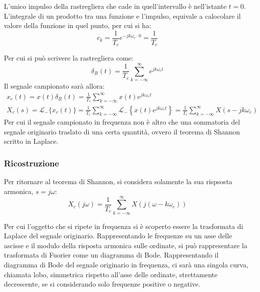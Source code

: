 \documentclass{article}
\numberwithin{equation}{subsection}
\begin{document}
L'unico impulso della rastregliera che cade in quell'intervallo è nell'istante $t=0$. L'integrale di un prodotto tra una funzione e l'impulso, equivale a calocolare il valore 
della funzione in quel punto, per cui si ha:
\begin{equation}
    c_k=\displaystyle\frac{1}{T_c}e^{-jk\omega_c \cdot0}=\frac{1}{T_c}
\end{equation}

Per cui si può scrivere la rastregliera come:
\begin{equation}
    \delta_R(t)=\displaystyle\frac{1}{T_c}\sum_{k=-\infty}^{\infty}e^{jk\omega_ct}
\end{equation}
Il segnale campionato sarà allora:
\begin{gather}
    x_c(t)=x(t)\delta_R(t)=\displaystyle\frac{1}{T_c}\sum_{k=-\infty}^{\infty}x(t)e^{jk\omega_ct}\\
    X_c(s)=\mathscr{L}_-\{x_c(t)\}=\displaystyle\frac{1}{T_c}\sum_{k=-\infty}^{\infty}\mathscr{L}_-\left\{x(t)e^{jk\omega_ct}\right\}=\frac{1}{T_c}\sum_{k=-\infty}^{\infty}X(s-jk\omega_c)
\end{gather}
Per cui il segnale campionato in frequenza non è altro che una sommatoria del segnale originario traslato di una certa quantità, ovvero il teorema di Shannon scritto in 
Laplace. 

\subsubsection{Ricostruzione}

Per ritornare al teorema di Shannon, si considera solamente la sua rispsosta armonica, $s=j\omega$:
\begin{equation}
    X_c(j\omega)=\displaystyle\frac{1}{T_c}\sum_{k=-\infty}^{\infty}X(j(\omega-k\omega_c))
\end{equation}

Per cui l'oggetto che si ripete in frequenza si è scoperto essere la trasformata di Laplace del 
segnale originario. Rappresentando le frequenze su un asse delle ascisse e il modulo della risposta armonica sulle ordinate, si può rappresentare la trasformata di Fuorier 
come un diagramma di Bode. Rappresentando il diagramma di Bode del segnale originario in frequenza, ci sarà una singola curva, chiamata lobo, simmetrica rispetto all'asse 
delle ordinate, strettamente decrescente, se si considerando solo frequenze positive o negative. 
\begin{center}
\end{center}
\end{document}
